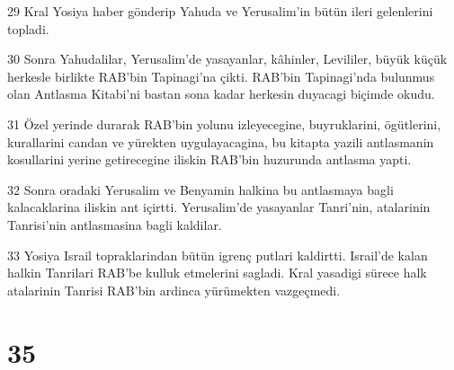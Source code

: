 \par 29 Kral Yosiya haber gönderip Yahuda ve Yerusalim'in bütün ileri gelenlerini topladi.
\par 30 Sonra Yahudalilar, Yerusalim'de yasayanlar, kâhinler, Levililer, büyük küçük herkesle birlikte RAB'bin Tapinagi'na çikti. RAB'bin Tapinagi'nda bulunmus olan Antlasma Kitabi'ni bastan sona kadar herkesin duyacagi biçimde okudu.
\par 31 Özel yerinde durarak RAB'bin yolunu izleyecegine, buyruklarini, ögütlerini, kurallarini candan ve yürekten uygulayacagina, bu kitapta yazili antlasmanin kosullarini yerine getirecegine iliskin RAB'bin huzurunda antlasma yapti.
\par 32 Sonra oradaki Yerusalim ve Benyamin halkina bu antlasmaya bagli kalacaklarina iliskin ant içirtti. Yerusalim'de yasayanlar Tanri'nin, atalarinin Tanrisi'nin antlasmasina bagli kaldilar.
\par 33 Yosiya Israil topraklarindan bütün igrenç putlari kaldirtti. Israil'de kalan halkin Tanrilari RAB'be kulluk etmelerini sagladi. Kral yasadigi sürece halk atalarinin Tanrisi RAB'bin ardinca yürümekten vazgeçmedi.

\chapter{35}

